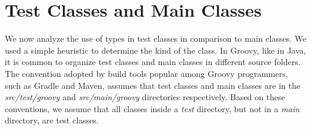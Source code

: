 \documentclass[msc]{ppgccufmg}
\begin{document}
% 
% 
% 





\section{Test Classes and Main Classes\label{sec:results-tests}}
We now analyze the use of types in test classes in comparison to main classes.
We used a simple heuristic to determine the kind of the class.
In Groovy, like in Java, it is common to organize test classes and main classes in different source folders.
The convention adopted by build tools popular among Groovy programmers, such as Gradle and Maven, assumes that test classes and main classes are in the \emph{src/test/groovy} and \emph{src/main/groovy} directories respectively.
Based on these conventions, we assume that all classes inside a \emph{test} directory, but not in a \emph{main} directory, are test classes.
\end{document}
